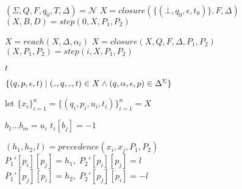 \documentclass[AMA,STIX1COL]{WileyNJD-v2}
\newcommand{\Xund}{\rule{.4em}{.4pt}}
\newcommand{\XN}{\mathcal{N}}
\begin{document}
\begin{figure*}
\begin{multicols}{2}


    \begin{algorithm}[H] \DontPrintSemicolon {} 
    \Fn {$\underline{match (\XN, \alpha_1 \dots \alpha_n)} \smallskip$} {
        $(\Sigma, Q, F, q_0, T, \Delta) = \XN$ \;
        $X = closure(\{ (\bot, q_0, \epsilon, t_0) \}, F, \Delta)$ \;
        $(X, B, D) = step(0, X, P_1, P_2)$ \;

        \BlankLine
         {
            $X = reach(X, \Delta, \alpha_i)$ \;
            $X = closure(X, Q, F, \Delta, P_1, P_2)$ \;
            $(X, P_1, P_2) = step(i, X, P_1, P_2)$ \;
        }

        \BlankLine
        \lIf {$\exists (\Xund, p, \Xund, t) \in X \mid p \in F$} {
            \Return $t$
        } \lElse {
            \Return $\bot$
        }
    }
    \end{algorithm}


    \begin{algorithm}[H] \DontPrintSemicolon {} 
     {
        \Return $\{ (q, p, \epsilon, t) \mid (\Xund, q, \Xund, t) \in X \wedge
            (q, \alpha, \epsilon, p) \in \Delta^\Sigma \}$
    }
    \end{algorithm}


    \begin{algorithm}[H] \DontPrintSemicolon {} 
     {
        let $\{ x_i \}_{i=1}^{n} = \{(q_i, p_i, u_i, t_i) \}_{i=1}^{n} = X$

        \BlankLine
         {
            $b_1 \dots b_m = u_i$ \;
             {
                 {$t_i[b_j] = -1$}
            }
        }

        \BlankLine
         {
             {
                $(h_1, h_2, l) = precedence (x_i, x_j, P_1, P_2)$ \;
                $P_1' [p_i] [p_j] = h_1, \; P_2' [p_i] [p_j] = l$ \;
                $P_1' [p_j] [p_i] = h_2, \; P_2' [p_j] [p_i] = -l$ \;
            }
        }

}
\end{algorithm}
\end{multicols}
\end{figure*}
\end{document}

